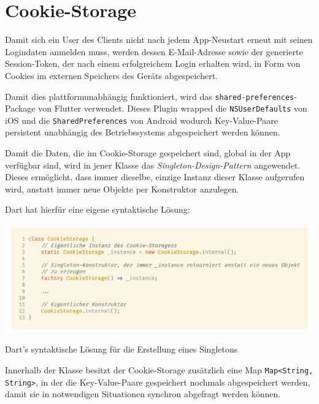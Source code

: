 \section{Cookie-Storage}

Damit sich ein User des Clients nicht nach jedem App-Neustart erneut mit seinen Logindaten anmelden muss,
werden dessen E-Mail-Adresse sowie der generierte Session-Token, der nach einem erfolgreichem Login erhalten wird, 
in Form von Cookies im externen Speichers des Geräts abgespeichert.


Damit dies plattformunabhängig funktioniert, wird das \lstinline{shared-preferences}-Package von Flutter
verwendet.
Dieses Plugin wrapped die \lstinline{NSUserDefaults} von iOS und die \lstinline{SharedPreferences} von Android
wodurch Key-Value-Paare persistent unabhängig des Betriebssystems abgespeichert werden können.

Damit die Daten, die im Cookie-Storage gespeichert sind, global in der App verfügbar sind, wird in jener
Klasse das \textit{Singleton-Design-Pattern} angewendet. Dieses ermöglicht, dass immer dieselbe, einzige Instanz
dieser Klasse aufgerufen wird, anstatt immer neue Objekte per Konstruktor anzulegen.

\newpage

Dart hat hierfür eine eigene syntaktische Lösung:

\begin{code}
    \centering
    \includegraphics[width=1\textwidth]{images/Dart/util/cookie-storage/cookieStorageSingleton.png}
    \caption{Dart's syntaktische Lösung für die Erstellung eines Singletons}
\end{code}

Innerhalb der Klasse besitzt der Cookie-Storage zusätzlich eine Map \lstinline{Map<String, String>}, in der die Key-Value-Paare
gespeichert nochmals abgespeichert werden, damit sie in notwendigen Situationen synchron abgefragt werden können.


